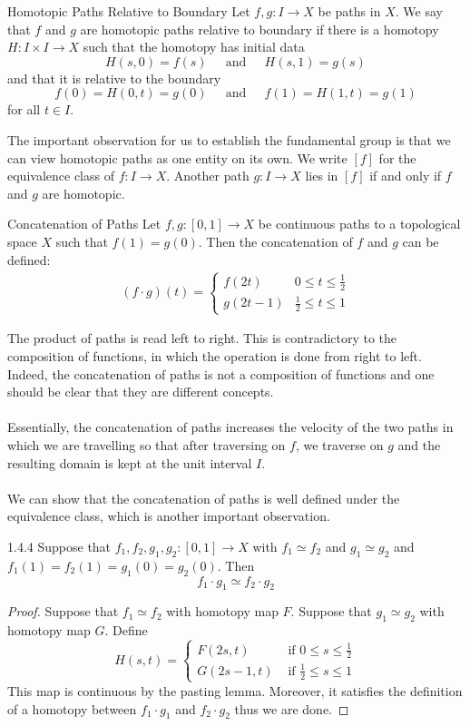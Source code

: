 \documentclass[a4paper]{article}
\begin{document}
\begin{defn}{Homotopic Paths Relative to Boundary}{} Let $f,g:I\to X$ be paths in $X$. We say that $f$ and $g$ are homotopic paths relative to boundary if there is a homotopy $H:I\times I\to X$ such that the homotopy has initial data $$H(s,0)=f(s)\;\;\;\;\text{ and }\;\;\;\;H(s,1)=g(s)$$ and that it is relative to the boundary $$f(0)=H(0,t)=g(0)\;\;\;\;\text{ and }\;\;\;\;f(1)=H(1,t)=g(1)$$ for all $t\in I$. 
\end{defn}

The important observation for us to establish the fundamental group is that we can view homotopic paths as one entity on its own. We write $[f]$ for the equivalence class of $f:I\to X$. Another path $g:I\to X$ lies in $[f]$ if and only if $f$ and $g$ are homotopic. 

\begin{defn}{Concatenation of Paths}{} Let $f,g:[0,1]\to X$ be continuous paths to a topological space $X$ such that $f(1)=g(0)$. Then the concatenation of $f$ and $g$ can be defined:
\begin{align*}
(f\cdot g)(t)=\begin{cases}
f(2t) & 0\leq t\leq\frac{1}{2}\\
g(2t-1) & \frac{1}{2}\leq t\leq 1
\end{cases}
\end{align*}
\end{defn}

The product of paths is read left to right. This is contradictory to the composition of functions, in which the operation is done from right to left. Indeed, the concatenation of paths is not a composition of functions and one should be clear that they are different concepts. \\~\\

Essentially, the concatenation of paths increases the velocity of the two paths in which we are travelling so that after traversing on $f$, we traverse on $g$ and the resulting domain is kept at the unit interval $I$. \\~\\

We can show that the concatenation of paths is well defined under the equivalence class, which is another important observation. 

\begin{lmm}{}{1.4.4} Suppose that $f_1,f_2,g_1,g_2:[0,1]\to X$ with $f_1\simeq f_2$ and $g_1\simeq g_2$ and $f_1(1)=f_2(1)=g_1(0)=g_2(0)$. Then $$f_1\cdot g_1\simeq f_2\cdot g_2$$ \tcbline
\begin{proof}
Suppose that $f_1\simeq f_2$ with homotopy map $F$. Suppose that $g_1\simeq g_2$ with homotopy map $G$. Define $$H(s,t)=\begin{cases}
F(2s,t) & \text{ if } 0\leq s\leq\frac{1}{2}\\
G(2s-1,t) & \text{ if } \frac{1}{2}\leq s\leq 1
\end{cases}$$
This map is continuous by the pasting lemma. Moreover, it satisfies the definition of a homotopy between $f_1\cdot g_1$ and $f_2\cdot g_2$ thus we are done. 
\end{proof}
\end{lmm}
\end{document}
